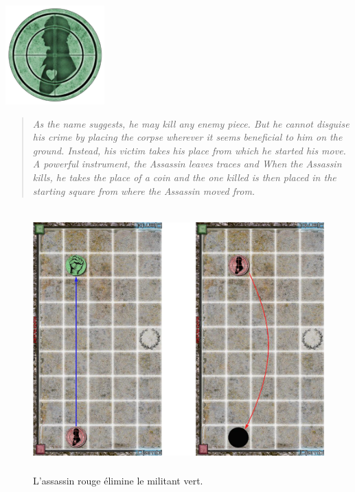 \documentclass{article}
\begin{document}
\vspace{20pt} %
\noindent %
\begin{minipage}{0.3\textwidth} %
\includegraphics[width=1.5in,height=1.5in]{media/image8.png}
\end{minipage}%
\hfill %
\begin{minipage}{0.75\textwidth} %

\begin{quote}
\textit{
As the name suggests, he may kill any enemy piece. But he cannot
disguise his crime by placing the corpse wherever it seems beneficial to
him on the ground. Instead, his victim takes his place from which he
started his move. A powerful instrument, the Assassin leaves traces and
When the Assassin kills, he takes the place of a coin and the one killed
is then placed in the starting square from where the Assassin moved
from.}
\end{quote}
\end{minipage}
\vspace{25pt} %

\begin{figure}[ht]
\centering
\includegraphics[width=5in,height=4in]{media/image9.png}
\caption{L'assassin rouge élimine le militant vert.}
\end{figure}
\newpage
\end{document}
